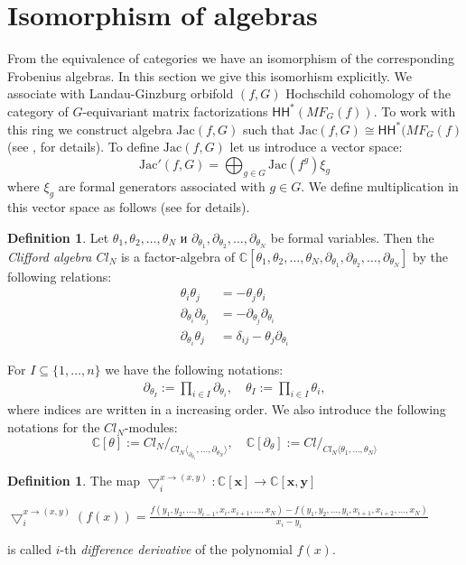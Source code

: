\documentclass[reqno,12pt]{amsart}
\numberwithin{equation}{section}
\theoremstyle{plain}
\theoremstyle{definition}
\newtheorem{definition}[theorem]{Definition}
\newcommand{\CC}{{\mathbb{C}}}
\newcommand{\Jac}{\mathrm{Jac}}
\newcommand{\ccHH}{{\mathsf{HH}}}
\begin{document}
\section{Isomorphism of algebras}
From the equivalence of categories we have an isomorphism of the corresponding Frobenius algebras. In this section we give this isomorhism explicitly.
 We associate with Landau-Ginzburg orbifold $(f,G)$ Hochschild cohomology of the category of $G$-equivariant matrix factorizations $\ccHH^*(MF_G(f))$. To work with this ring we construct algebra $\Jac(f,G)$ such that $\Jac(f,G) \cong \ccHH^*(MF_G(f)$ (see \cite{Sh} \cite{BTW1}, \cite{BT1} for details). To define $\Jac(f,G)$ let us introduce a vector space: 
\[ \Jac'(f,G)= \bigoplus_{g \in G} \Jac(f^g)\xi_g\]
where $\xi_g$ are formal generators associated with $g \in G$. We define multiplication in this vector space as follows (see \cite{Sh} for details).
\begin{definition} Let $\theta_1, \theta_2, \dots, \theta_N$ и $\partial_{\theta_1}, \partial_{\theta_2}, \dots, \partial_{\theta_N}$ be formal variables. Then the \emph{Clifford algebra $Cl_N$} is a factor-algebra of $\mathbb{C}[\theta_1, \theta_2, \dots, \theta_N, \partial_{\theta_1}, \partial_{\theta_2}, \dots, \partial_{\theta_N}]$ by the following relations:
\begin{align*}
    \theta_i\theta_j &= -\theta_j\theta_i \\  \partial_{\theta_i}\partial_{\theta_j} &= -\partial_{\theta_j}\partial_{\theta_i}\\
    \partial_{\theta_i}\theta_j &= \delta_{ij} - \theta_j\partial_{\theta_i}
\end{align*}
\end{definition}
For $I\subseteq\{1,\ldots,n\}$ we have the following notations:
\begin{align*}
\partial_{\theta_{I}}:=\prod_{i\in I}\partial_{\theta_i}, 
\quad {\theta_{I}}:=\prod_{i\in I}{\theta_i},
\end{align*}
where indices are written in a increasing order. We also introduce the following notations for the $Cl_N$-modules:  
\[
\CC[{\theta}] := Cl_N/_{Cl_N\langle_{\partial_{\theta_1}},\ldots,{\partial_{\theta_N}}\rangle}, \quad \CC[\partial_{\theta}] := Cl/_{Cl_N\langle{{\theta_1}},\ldots,{{\theta_N}}\rangle} 
\]  

\begin{definition} The map $\bigtriangledown_i^{x\to(x,y)}\colon\mathbb{C}[\textbf{x}]\to\mathbb{C}[\textbf{x},\textbf{y}]$ 
\begin{center}
$\bigtriangledown_i^{x\to (x,y)}(f(x)) = \frac{f(y_1, y_2, \dots, y_{i-1}, x_{i}, x_{i+1}, \dots, x_N) - f(y_1, y_2, \dots, y_{i}, x_{i+1}, x_{i+2}, \dots, x_N)}{x_i-y_i}$
\end{center}
is called $i$-th \emph{difference derivative} of the polynomial $f(x)$.
\end{definition}
\end{document}

